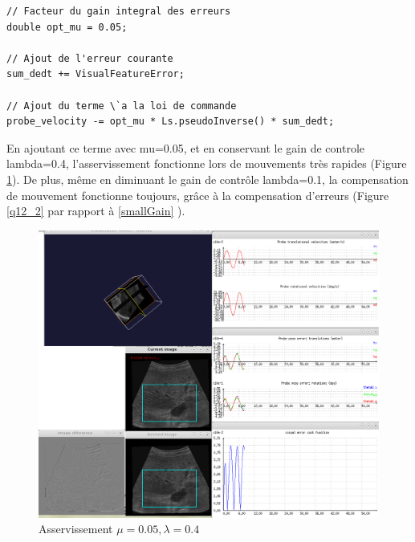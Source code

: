 \documentclass[a4paper,11pt]{article}
\begin{document}
\begin{verbatim}
// Facteur du gain integral des erreurs
double opt_mu = 0.05;

// Ajout de l'erreur courante
sum_dedt += VisualFeatureError;

// Ajout du terme \`a la loi de commande
probe_velocity -= opt_mu * Ls.pseudoInverse() * sum_dedt;
\end{verbatim}


En ajoutant ce terme avec mu=0.05, et en conservant le gain de controle lambda=0.4, l'asservissement fonctionne lors de mouvements très rapides (Figure \ref{q12_1}). De plus, m\^eme en diminuant le gain de contr\^ole lambda=0.1, la compensation de mouvement fonctionne toujours, gr\^ace \`a la compensation d'erreurs (Figure \ref{q12_2} par rapport \`a \ref{smallGain} ).
\begin{figure}[H]
    \centering
    \includegraphics[width=0.5\textheight]{./images/q12_0,05_0,4.png}
    \caption{Asservissement $\mu = 0.05, \lambda = 0.4$ }
    \label{q12_1}
\end{figure}
\end{document}
